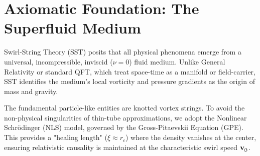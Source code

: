 \documentclass[11pt]{article}
\newcommand{\vswirl}{\mathbf{v}_{\mkern-2mu\scriptscriptstyle\boldsymbol{\circlearrowleft}}}
\newcommand{\rc}{r_c}                                    %
\begin{document}

\newcommand{\Gammazero}{\Gamma_0}

\newcommand{\phiG}{\varphi}
\newcommand{\me}{m_e}
\newcommand{\Eeff}{\mathcal{E}_{\rm eff}}

\titleformat{\section}{\large\bfseries}{\thesection}{1em}{}





\appendix

\newpage
\begin{abstract}
This paper formalizes the transition from classical Rankine vortex models to a microscopic Nonlinear Schrödinger (NLS) vortex framework within Swirl-String Theory (SST). We demonstrate that the thermodynamic requirement for a constant pressure (Const druk) hollow-core potential uniquely selects the Golden Ratio ($\phiG$) as the fundamental parameter of the vortex core. We derive the electron rest mass from the self-intersection of a trefoil knot, resulting in a degenerate torus topology ($R_e < r_c$) consistent with Hill's Spherical Vortex. Furthermore, we provide a hydrodynamic derivation of the Planck constant ($\hbar$) and the anomalous magnetic moment, attributing the latter to acoustic boundary-layer radiation (Schwinger term). Finally, we demonstrate that the lepton mass gaps (Electron, Muon, Tau) emerge from Discrete Scale Invariant (DSI) screening layers following a $\phiG^{-2k}$ geometric progression.
\end{abstract}

\section{Axiomatic Foundation: The Superfluid Medium}
Swirl-String Theory (SST) posits that all physical phenomena emerge from a universal, incompressible, inviscid ($\nu=0$) fluid medium. Unlike General Relativity or standard QFT, which treat space-time as a manifold or field-carrier, SST identifies the medium's local vorticity and pressure gradients as the origin of mass and gravity.

The fundamental particle-like entities are knotted vortex strings. To avoid the non-physical singularities of thin-tube approximations, we adopt the Nonlinear Schrödinger (NLS) model, governed by the Gross-Pitaevskii Equation (GPE). This provides a "healing length" ($\xi \approx \rc$) where the density vanishes at the center, ensuring relativistic causality is maintained at the characteristic swirl speed $\vswirl$.
\end{document}
